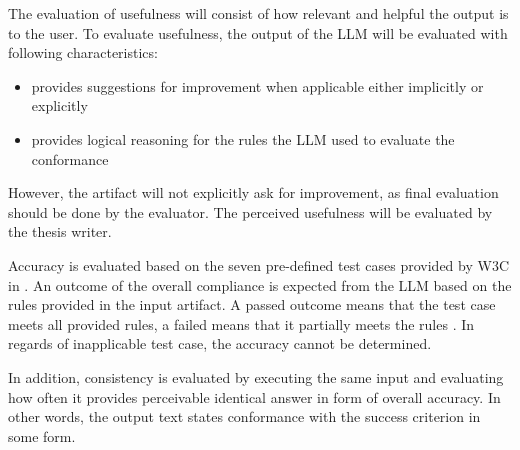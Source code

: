 The evaluation of usefulness will consist of how relevant and helpful the output is to the user. To evaluate usefulness, the output of the LLM will be evaluated with following characteristics: 

\begin{itemize}
    \item provides suggestions for improvement when applicable either implicitly or explicitly
    \item provides logical reasoning for the rules the LLM used to evaluate the conformance
\end{itemize}

However, the artifact will not explicitly ask for improvement, as final evaluation should be done by the evaluator. The perceived usefulness will be evaluated by the thesis writer.

Accuracy is evaluated based on the seven pre-defined test cases provided by W3C in \textcite{act_rule_g88}. An outcome of the overall compliance is expected from the LLM based on the rules provided in the input artifact. A passed outcome means that the test case meets all provided rules, a failed means that it partially meets the rules \citep{act_rule_g88}. In regards of inapplicable test case, the accuracy cannot be determined. 

In addition, consistency is evaluated by executing the same input and evaluating how often it provides perceivable identical answer in form of overall accuracy. In other words, the output text states conformance with the success criterion in some form. 

